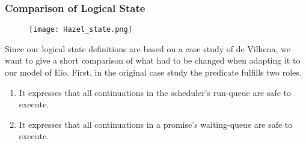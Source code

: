 


\subsubsection{Comparison of Logical State}
\label{sec:sched-spec-state-comparison}

\begin{figure}[ht]
  \texttt{[image: Hazel\_state.png]}
\end{figure}

Since our logical state definitions are based on a case study of de Vilhena, we want to give a short comparison of what had to be changed when adapting it to our model of Eio.
First, in the original case study the \gsReady{} predicate fulfills two roles.
\begin{enumerate}
  \item It expresses that all continuations in the scheduler's run-queue are safe to execute.
  \item It expresses that all continuations in a promise's waiting-queue are safe to execute.
\end{enumerate}

